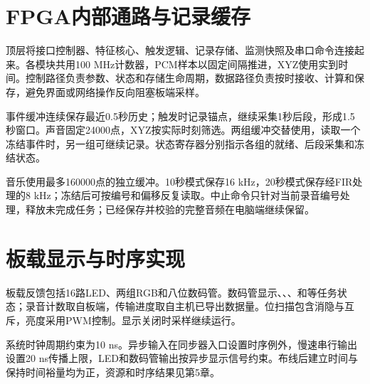 \section{FPGA内部通路与记录缓存}
顶层将接口控制器、特征核心、触发逻辑、记录存储、监测快照及串口命令连接起来。各模块共用100 MHz计数器，PCM样本以固定间隔推进，XYZ使用实到时间。控制路径负责参数、状态和存储生命周期，数据路径负责按时接收、计算和保存，避免界面或网络操作反向阻塞板端采样。


事件缓冲连续保存最近0.5秒历史；触发时记录锚点，继续采集1秒后段，形成1.5秒窗口。声音固定24000点，XYZ按实际时刻筛选。两组缓冲交替使用，读取一个冻结事件时，另一组可继续记录。状态寄存器分别指示各组的就绪、后段采集和冻结状态。

音乐使用最多160000点的独立缓冲。10秒模式保存16 kHz，20秒模式保存经FIR处理的8 kHz；冻结后可按编号和偏移反复读取。中止命令只针对当前录音编号处理，释放未完成任务；已经保存并校验的完整音频在电脑端继续保留。

\section{板载显示与时序实现}
板载反馈包括16路LED、两组RGB和八位数码管。数码管显示、、、和等任务状态；录音计数取自板端，传输进度取自主机已导出数据量。位扫描包含消隐与互斥，亮度采用PWM控制。显示关闭时采样继续运行。

系统时钟周期约束为10 ns。异步输入在同步器入口设置时序例外，慢速串行输出设置20 ns传播上限，LED和数码管输出按异步显示信号约束。布线后建立时间与保持时间裕量均为正，资源和时序结果见第5章。
